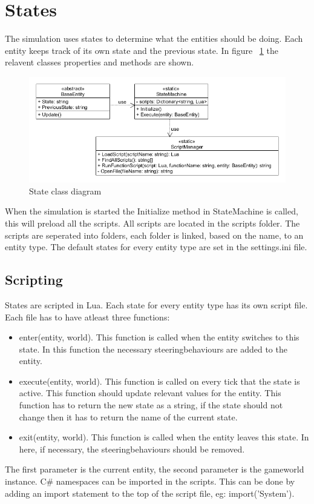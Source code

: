 \documentclass{article}
\begin{document}
 
   \newpage   
   \section {States}
   The simulation uses states to determine what the entities should be doing. Each entity keeps track of its own state and the previous state. In figure ~\ref{fig:stateClassDiagram} the relavent classes properties and methods are shown. 
   \begin{figure}[h!]
   \includegraphics[width=\textwidth]{stateuml.png}
   \caption{State class diagram}
   \label{fig:stateClassDiagram}
   \end{figure}
   When the simulation is started the Initialize method in StateMachine is called, this will preload all the scripts. All scripts are located in the scripts folder. The scripts are seperated into folders, each folder is linked, based on the name, to an entity type.
   The default states for every entity type are set in the settings.ini file.
   \subsection {Scripting}
   States are scripted in Lua. Each state for every entity type has its own script file. Each file has to have atleast three functions: 
   \begin{itemize}
   \item enter(entity, world). This function is called when the entity switches to this state. In this function the necessary steeringbehaviours are added to the entity.
   \item execute(entity, world). This function is called on every tick that the state is active. This function should update relevant values for the entity. This function has to return the new state as a string, if the state should not change then it has to return the name of the current state.
   \item exit(entity, world). This function is called when the entity leaves this state. In here, if necessary, the steeringbehaviours should be removed.
   \end{itemize}
   The first parameter is the current entity, the second parameter is the gameworld instance. C\# namespaces can be imported in the scripts. This can be done by adding an import statement to the top of the script file, eg: import('System').
   
\end{document}
